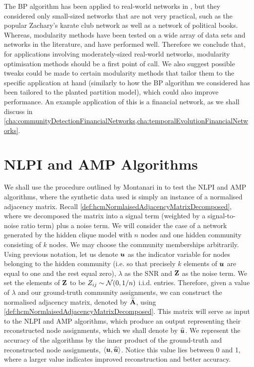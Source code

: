 The BP algorithm has been applied to real-world networks in \cite{DKM+13}, but they considered only small-sized networks that are not very practical, such as the popular Zachary's karate club network as well as a network of political books.
Whereas, modularity methods have been tested on a wide array of data sets and networks in the literature, and have performed well.
Therefore we conclude that, for applications involving moderately-sized real-world networks, modularity optimisation methods should be a first point of call.
We also suggest possible tweaks could be made to certain modularity methods that tailor them to the specific application at hand (similarly to how the BP algorithm we considered has been tailored to the planted partition model), which could also improve performance.
An example application of this is a financial network, as we shall discuss in \cref{cha:communityDetectionFinancialNetworks,cha:temporalEvolutionFinancialNetworks}.


\section{NLPI and AMP Algorithms}
\label{sec:NLPIAndAMPAlgorithms}

We shall use the procedure outlined by Montanari in \cite{Mon13} to test the NLPI and AMP algorithms, where the synthetic data used is simply an instance of a normalised adjacency matrix. Recall \cref{def:hcmNormlaisedAdjacencyMatrixDecomposed}, where we decomposed the matrix into a signal term (weighted by a signal-to-noise ratio term) plus a noise term.
We will consider the case of a network generated by the hidden clique model with $n$ nodes and one hidden community consisting of $k$ nodes.
We may choose the community memberships arbitrarily. Using previous notation, let us denote $\vecvar{u}$ as the indicator variable for nodes belonging to the hidden community (i.e. so that precisely $k$ elements of $\vecvar{u}$ are equal to one and the rest equal zero), $\lambda$ as the SNR and $\mathbf Z$ as the noise term.
We set the elements of $\mathbf Z$ to be $Z_{ij} \sim \normal{0,1/n}$ i.i.d. entries.
Therefore, given a value of $\lambda$ and our ground-truth community assignments, we can construct the normalised adjacency matrix, denoted by $\widetilde{\mathbf A}$, using \cref{def:hcmNormlaisedAdjacencyMatrixDecomposed}.
This matrix will serve as input to the NLPI and AMP algorithms, which produce an output representing their reconstructed node assignments, which we shall denote by $\widehat{\vecvar{u}}$.
We represent the accuracy of the algorithms by the inner product of the ground-truth and reconstructed node assignments, $\innerP{\vecvar{u},\widehat{\vecvar{u}}}$.
Notice this value lies between 0 and 1, where a larger value indicates improved reconstruction and better accuracy.

